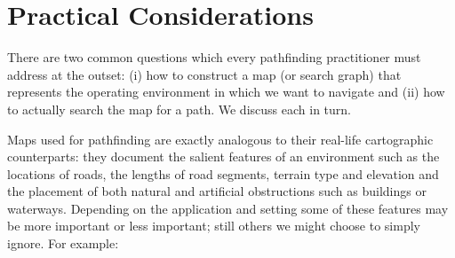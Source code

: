 \section{Practical Considerations}
\label{cha::intro::practical}

There are two common questions which every pathfinding practitioner must address
at the outset:
 (i) how to construct a map (or search graph) that represents the operating 
environment in which we want to navigate and (ii) how to actually search the map
for a path. We discuss each in turn.

Maps used for pathfinding are exactly analogous to their real-life cartographic 
counterparts: they document the salient features of an environment such as the
locations of roads, the lengths of road segments, terrain type and elevation
and the placement of both natural and artificial obstructions such as buildings 
or waterways. 
Depending on the application and setting some of these 
features may be more important or less important; still others we might choose
 to simply ignore. For example:

